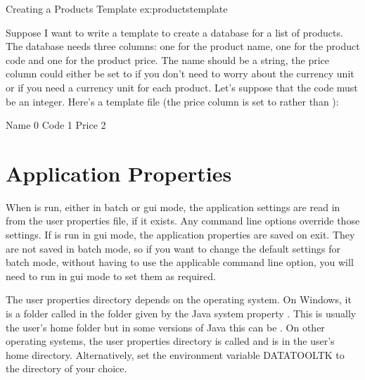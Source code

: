 \begin{example} 
 {Creating a Products Template}
 {ex:productstemplate}

   Suppose I want to write a template to create a database
   for a list of products. The database needs three columns: one for
   the product name, one for the product code and one for the product price.
   The name should be a string, the price column could either be set
   to  if you don't need to worry about the currency unit
   or  if you need a currency unit for each product.
   Let's suppose that the code must be an integer.
   Here's a template file (the price column is set to 
   rather than ):

\begin{compactcodebox}
    Name
    0
    Code
    1
    Price
    2
\end{compactcodebox}
\end{example}

\chapter{Application Properties}\label{sec:preferences}

When  is run, either in batch or \gls{gui} mode, 
the application settings are read in from the user properties file, 
if it exists. Any command line options override those settings.
If  is run in \gls{gui} mode, the application
properties are saved on exit. They are not saved in batch mode, so
if you want to change the default settings for batch mode, without
having to use the applicable command line option, you will need to run
 in \gls{gui} mode to set them as required.

The user properties directory depends on the operating system.
On Windows, it is a folder called 
in the folder given by the Java system property .
This is usually the user's home folder but in some versions of
Java this can be .
On other operating systems, the user properties directory is
called  and is in the user's home directory.
Alternatively, set the environment variable \gls{DATATOOLTK}
to the directory of your choice.

